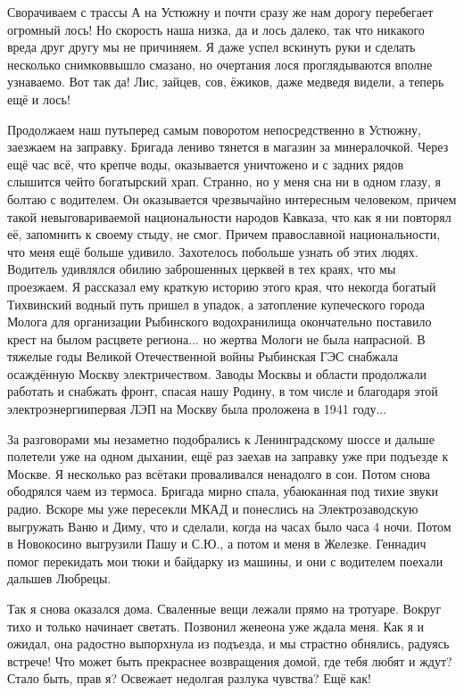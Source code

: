 Сворачиваем с трассы А на Устюжну и почти сразу же нам дорогу перебегает огромный лось! Но скорость наша низка, да и лось далеко, так что никакого вреда друг другу мы не причиняем. Я даже успел вскинуть руки и сделать несколько снимков\mdash вышло смазано, но очертания лося проглядываются вполне узнаваемо. Вот так да! Лис, зайцев, сов, ёжиков, даже медведя видели, а теперь ещё и лось! 

Продолжаем наш путь\mdash перед самым поворотом непосредственно в Устюжну, заезжаем на заправку. Бригада лениво тянется в магазин за минералочкой. Через ещё час всё, что крепче воды, оказывается уничтожено и с задних рядов слышится чей\sdash то богатырский храп. Странно, но у меня сна ни в одном глазу, я болтаю с водителем. Он оказывается чрезвычайно интересным человеком, причем такой невыговариваемой национальности народов Кавказа, что как я ни повторял её, запомнить к своему стыду, не смог. Причем православной национальности, что меня ещё больше удивило. Захотелось побольше узнать об этих людях. Водитель удивлялся обилию заброшенных церквей в тех краях, что мы проезжаем. Я рассказал ему краткую историю этого края, что некогда богатый Тихвинский водный путь пришел в упадок, а затопление купеческого города Молога для организации Рыбинского водохранилища окончательно поставило крест на былом расцвете региона$\ldots$ но жертва Мологи не была напрасной. В тяжелые годы Великой Отечественной войны Рыбинская ГЭС снабжала осаждённую Москву электричеством. Заводы Москвы и области продолжали работать и снабжать фронт, спасая нашу Родину, в том числе и благодаря этой электроэнергии\mdash первая ЛЭП на Москву была проложена в 1941 году$\ldots$ 

За разговорами мы незаметно подобрались к Ленинградскому шоссе и дальше полетели уже на одном дыхании, ещё раз заехав на заправку уже при подъезде к Москве. Я несколько раз всё\sdash таки проваливался ненадолго в сон. Потом снова ободрялся чаем из термоса. Бригада мирно спала, убаюканная под тихие звуки радио. Вскоре мы уже пересекли МКАД и понеслись на Электрозаводскую выгружать Ваню и Диму, что и сделали, когда на часах было часа 4 ночи. Потом в Новокосино выгрузили Пашу и С.Ю., а потом и меня в Железке. Геннадич помог перекидать мои тюки и байдарку из машины, и они с водителем поехали дальше\mdash в Любрецы. 

Так я снова оказался дома. Сваленные вещи лежали прямо на тротуаре. Вокруг тихо и только начинает светать. Позвонил жене\mdash она уже ждала меня. Как я и ожидал, она радостно выпорхнула из подъезда, и мы страстно обнялись, радуясь встрече! Что может быть прекраснее возвращения домой, где тебя любят и ждут? Стало быть, прав я? Освежает недолгая разлука чувства? Ещё как! 

\begin{center}
\end{center}
